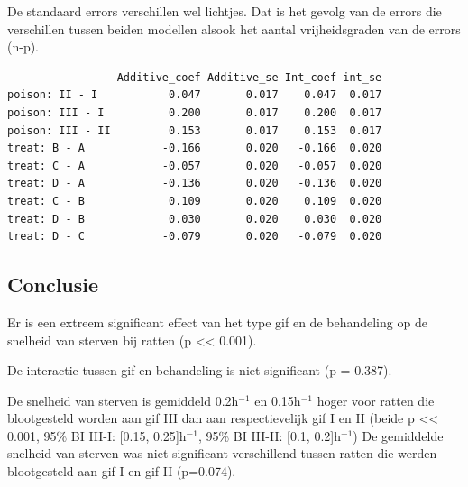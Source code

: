 \documentclass[
  dutch,
  letterpaper,
  12pt]{book}
\newenvironment{Shaded}{\begin{snugshade}}{\end{snugshade}}
\newcommand{\AttributeTok}[1]{\textcolor[rgb]{0.40,0.45,0.13}{#1}}
\newcommand{\DecValTok}[1]{\textcolor[rgb]{0.68,0.00,0.00}{#1}}
\newcommand{\FunctionTok}[1]{\textcolor[rgb]{0.28,0.35,0.67}{#1}}
\newcommand{\NormalTok}[1]{\textcolor[rgb]{0.00,0.23,0.31}{#1}}
\newcommand{\SpecialCharTok}[1]{\textcolor[rgb]{0.37,0.37,0.37}{#1}}
\theoremstyle{definition}
\theoremstyle{definition}
\theoremstyle{definition}
\theoremstyle{remark}
\begin{document}
De standaard errors verschillen wel lichtjes. Dat is het gevolg van de
errors die verschillen tussen beiden modellen alsook het aantal
vrijheidsgraden van de errors (n-p).

\begin{Shaded}
\end{Shaded}

\begin{verbatim}
                 Additive_coef Additive_se Int_coef int_se
poison: II - I           0.047       0.017    0.047  0.017
poison: III - I          0.200       0.017    0.200  0.017
poison: III - II         0.153       0.017    0.153  0.017
treat: B - A            -0.166       0.020   -0.166  0.020
treat: C - A            -0.057       0.020   -0.057  0.020
treat: D - A            -0.136       0.020   -0.136  0.020
treat: C - B             0.109       0.020    0.109  0.020
treat: D - B             0.030       0.020    0.030  0.020
treat: D - C            -0.079       0.020   -0.079  0.020
\end{verbatim}

\subsection{Conclusie}\label{conclusie-3}

Er is een extreem significant effect van het type gif en de behandeling
op de snelheid van sterven bij ratten (p \textless\textless{} 0.001).

De interactie tussen gif en behandeling is niet significant (p = 0.387).

De snelheid van sterven is gemiddeld 0.2h\(^{-1}\) en 0.15h\(^{-1}\)
hoger voor ratten die blootgesteld worden aan gif III dan aan
respectievelijk gif I en II (beide p \textless\textless{} 0.001, 95\% BI
III-I: {[}0.15, 0.25{]}h\(^{-1}\), 95\% BI III-II: {[}0.1,
0.2{]}h\(^{-1}\)) De gemiddelde snelheid van sterven was niet
significant verschillend tussen ratten die werden blootgesteld aan gif I
en gif II (p=0.074).
\end{document}
